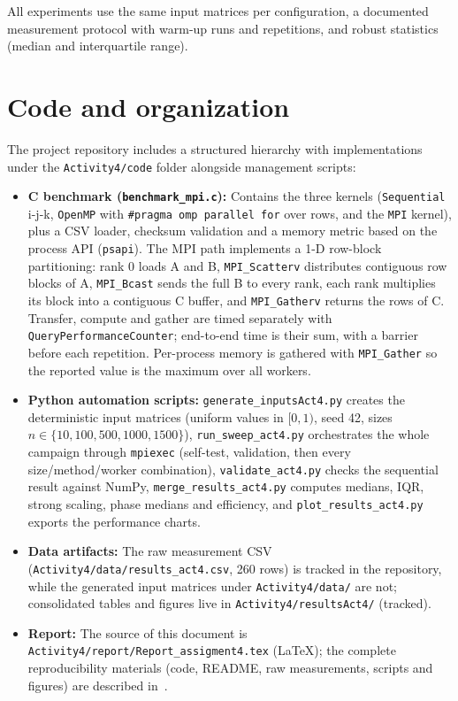\documentclass[12pt,a4paper]{article}
\begin{document}
All experiments use the same input matrices per configuration, a documented
measurement protocol with warm-up runs and repetitions, and robust
statistics (median and interquartile range).

\section{Code and organization}
\label{sec:code}

The project repository includes a structured hierarchy with implementations
under the \texttt{Activity4/code} folder alongside management scripts:
\begin{itemize}
\item \textbf{C benchmark (\texttt{benchmark\_mpi.c}):} Contains the three
kernels (\texttt{Sequential} i-j-k, \texttt{OpenMP} with
\texttt{\#pragma omp parallel for} over rows, and the \texttt{MPI} kernel),
plus a CSV loader, checksum validation and a memory metric based on the
process API (\texttt{psapi}). The MPI path implements a 1-D row-block
partitioning: rank 0 loads A and B, \texttt{MPI\_Scatterv} distributes
contiguous row blocks of A, \texttt{MPI\_Bcast} sends the full B to every
rank, each rank multiplies its block into a contiguous C buffer, and
\texttt{MPI\_Gatherv} returns the rows of C. Transfer, compute and gather are
timed separately with \texttt{QueryPerformanceCounter}; end-to-end time is
their sum, with a barrier before each repetition. Per-process memory is
gathered with \texttt{MPI\_Gather} so the reported value is the maximum over
all workers.
\item \textbf{Python automation scripts:} \texttt{generate\_inputsAct4.py}
creates the deterministic input matrices (uniform values in $[0,1)$, seed
42, sizes $n \in \{10, 100, 500, 1000, 1500\}$), \texttt{run\_sweep\_act4.py}
orchestrates the whole campaign through \texttt{mpiexec} (self-test,
validation, then every size/method/worker combination),
\texttt{validate\_act4.py} checks the sequential result against NumPy,
\texttt{merge\_results\_act4.py} computes medians, IQR, strong scaling,
phase medians and efficiency, and \texttt{plot\_results\_act4.py} exports the
performance charts.
\item \textbf{Data artifacts:} The raw measurement CSV
(\texttt{Activity4/data/results\_act4.csv}, 260 rows) is tracked in the
repository, while the generated input matrices under
\texttt{Activity4/data/} are not; consolidated tables and figures live in
\texttt{Activity4/resultsAct4/} (tracked).
\item \textbf{Report:} The source of this document is
\texttt{Activity4/report/Report\_assigment4.tex} (LaTeX); the complete
reproducibility materials (code, README, raw measurements, scripts and
figures) are described in~\cite{materials}.
\end{itemize}
\end{document}

